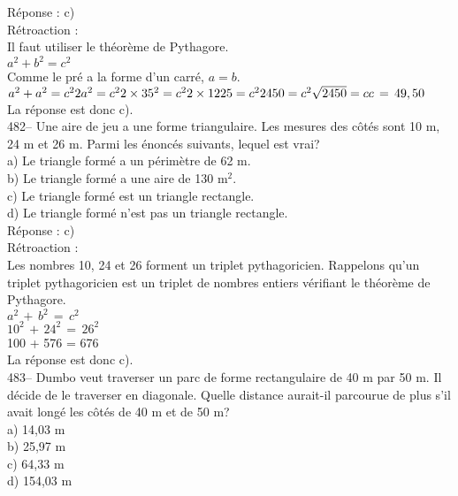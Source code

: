 ﻿\documentclass[letterpaper, 12pt]{article}
\begin{document}
R\'eponse :  c)\\

R\'etroaction : \\
Il faut utiliser le th\'eor\`eme de Pythagore.  \\
$a^{2}+b^{2}=c^{2}$\\
Comme le pr\'e a la forme d'un carr\'e, $a=b.$\\
$a^{2}+a^{2}=c^{2}\\
2a^{2}=c^{2}\\
2\times35^{2}=c^{2}\\
2\times 1225=c^{2}\\
2450=c^{2}\\
\sqrt{2450}=c\\
c\,=\,49,50$\\
La r\'eponse est donc c).\\


482-- Une aire de jeu a une forme triangulaire.  Les mesures des
c\^ot\'es sont 10 m, 24 m et 26 m.  Parmi les \'enonc\'es suivants,
lequel est vrai?\\
a) Le triangle form\'e a un p\'erim\`etre de 62 m.\\
b) Le triangle form\'e a une aire de 130 m$^{2}$.\\
c) Le triangle form\'e est un triangle rectangle.\\
d) Le triangle form\'e n'est pas un triangle rectangle.\\

R\'eponse :  c)\\

R\'etroaction : \\
Les nombres 10, 24 et 26 forment un triplet pythagoricien.  Rappelons qu'un
triplet pythagoricien est un triplet de nombres entiers v\'erifiant le
th\'eor\`eme de Pythagore.\\
$a^{2}\,+\,b^{2}\,=\,c^{2}$\\
$10^{2}\,+\,24^{2}\,=\,26^{2}$\\
100 + 576 = 676\\
La r\'eponse est donc c).\\

483-- Dumbo veut traverser un parc de forme rectangulaire de 40 m par 50 m.
Il d\'ecide de le traverser en diagonale.  Quelle distance aurait-il
parcourue de plus s'il avait long\'e les c\^ot\'es de 40 m et de 50 m?\\
a) 14,03 m\\
b) 25,97 m\\
c) 64,33 m\\
d) 154,03 m\\
\end{document}
